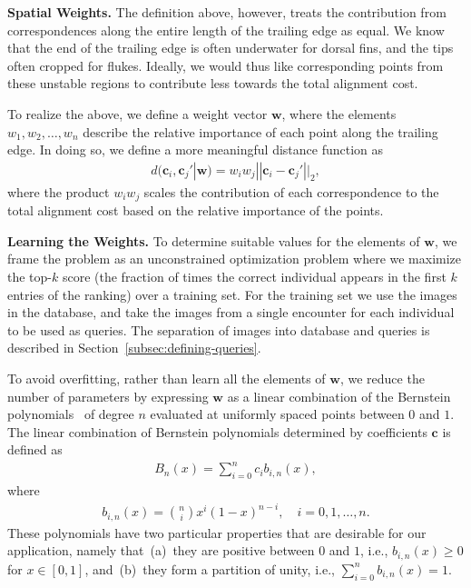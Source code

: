 \documentclass[10pt,twocolumn,letterpaper]{article}
\begin{document}
\textbf{Spatial Weights.}
The definition above, however, treats the contribution from correspondences
along the entire length of the trailing edge as equal.  We know that the end of
the trailing edge is often underwater for dorsal fins, and the tips often
cropped for flukes.  Ideally, we would thus like corresponding points from
these unstable regions to contribute less towards the total alignment cost.

To realize the above, we define a weight vector $\mathbf{w}$, where the
elements $w_1, w_2, \ldots, w_n$ describe the relative importance of each point
along the trailing edge.  In doing so, we define a more meaningful distance
function as
\vspace{-0.1in}
\begin{align}
  d(\mathbf{c}_i, \mathbf{c}_j' | \mathbf{w}) = w_iw_j||\mathbf{c}_i - \mathbf{c}_j'||_2,
\end{align}
where the product $w_iw_j$ scales the contribution of each correspondence to
the total alignment cost based on the relative importance of the points.

\textbf{Learning the Weights.}
To determine suitable values for the elements of $\mathbf{w}$, we frame the
problem as an unconstrained optimization problem where we maximize the top-$k$
score (the fraction of times the correct individual appears in the first $k$
entries of the ranking) over a training set.  For the training set we use the
images in the database, and take the images from a single encounter for each individual
to be used as queries.  The separation of images into database and queries is
described in Section~\ref{subsec:defining-queries}.  

To avoid overfitting, rather than learn all the
elements of $\mathbf{w}$, we reduce the number of parameters by expressing
$\mathbf{w}$ as a linear combination of the Bernstein polynomials~\cite{Lorentz12} of degree
$n$ evaluated at uniformly spaced points between $0$ and $1$.  The linear
combination of Bernstein polynomials determined by coefficients $\mathbf{c}$ is defined as
\begin{align}
  B_n(x) = \sum\limits_{i=0}^{n}c_ib_{i,n}(x),
\end{align}
where
\begin{align}
  b_{i,n}(x) = {n\choose i}x^i(1 - x)^{n - i},\quad i = 0, 1, \ldots, n.
\end{align}
These polynomials have two particular properties that are desirable for our
application, namely that~(a)~they are positive between $0$ and $1$, i.e.,
$b_{i,n}(x) \geq 0$ for $x \in [0, 1]$, and~(b)~they form a partition of unity, i.e., $\sum\limits_{i=0}^{n}b_{i,n}(x) = 1$.
\end{document}
